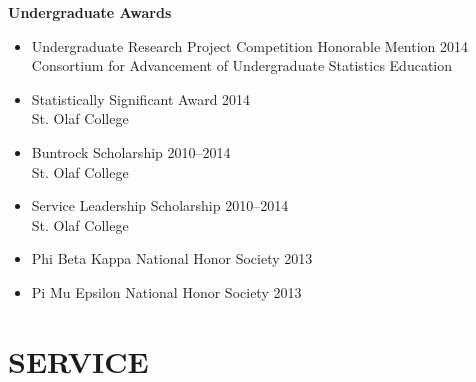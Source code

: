 \documentclass[margin]{res}
\begin{document}
\begin{resume}
\textbf{Undergraduate Awards}
\begin{itemize}
\item Undergraduate Research Project Competition Honorable Mention \hfill 2014  \\
Consortium for Advancement of Undergraduate Statistics Education
\item Statistically Significant Award \hfill 2014 \\
St. Olaf College
\item Buntrock Scholarship \hfill 2010--2014 \\
St. Olaf College 
\item Service Leadership Scholarship \hfill 2010--2014 \\
St. Olaf College 
\item Phi Beta Kappa National Honor Society \hfill 2013 
\item Pi Mu Epsilon National Honor Society \hfill 2013 
\end{itemize}


\section{SERVICE}  


\end{resume}
\end{document}
